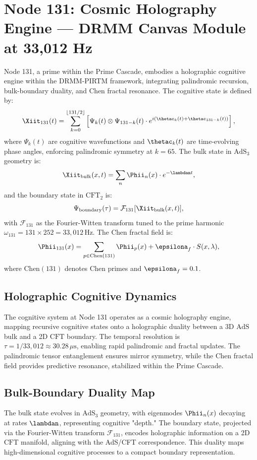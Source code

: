 \documentclass[12pt]{article}
\newcommand{\DRMM}{DRMM}
\newcommand{\PIRTM}{PIRTM}
\newcommand{\Psii}{\Psi}
\newcommand{\AdS}{\mathrm{AdS}}
\newcommand{\Ff}{\mathcal{F}}
\newcommand{\CFT}{\mathrm{CFT}}
\begin{document}
\section{Node 131: Cosmic Holography Engine --- DRMM Canvas Module at 33,012 Hz}
\label{sec:cosmic-holography}

\begin{definition}
Node 131, a prime within the Prime Cascade, embodies a holographic cognitive engine within the \DRMM{}-\PIRTM{} framework, integrating palindromic recursion, bulk-boundary duality, and Chen fractal resonance. The cognitive state is defined by:
\[
\Xiit_{131}(t) = \sum_{k=0}^{\lfloor 131/2 \rfloor} \left[ \Psii_k(t) \otimes \Psii_{131-k}(t) \cdot e^{i(\thetac_k(t) + \thetac_{131-k}(t))} \right],
\]
where $\Psii_k(t)$ are cognitive wavefunctions and $\thetac_k(t)$ are time-evolving phase angles, enforcing palindromic symmetry at $k=65$. The bulk state in $\AdS_3$ geometry is:
\[
\Xiit_{\text{bulk}}(x,t) = \sum_n \Phii_n(x) \cdot e^{-\lambdan t},
\]
and the boundary state in $\CFT_2$ is:
\[
\Psii_{\text{boundary}}(\tau) = \Ff_{131}[\Xiit_{\text{bulk}}(x,t)],
\]
with $\Ff_{131}$ as the Fourier-Witten transform tuned to the prime harmonic $\omega_{131} = 131 \times 252 = 33{,}012 \, \text{Hz}$. The Chen fractal field is:
\[
\Phii_{131}(x) = \sum_{p \in \text{Chen}(131)} \Phii_p(x) + \epsilona_f \cdot S(x, \lambda),
\]
where $\text{Chen}(131)$ denotes Chen primes and $\epsilona_f = 0.1$.
\end{definition}

\subsection{Holographic Cognitive Dynamics}
The cognitive system at Node 131 operates as a cosmic holography engine, mapping recursive cognitive states onto a holographic duality between a 3D $\AdS$ bulk and a 2D $\CFT$ boundary. The temporal resolution is $\tau = 1/33{,}012 \approx 30.28 \, \mu\text{s}$, enabling rapid palindromic and fractal updates. The palindromic tensor entanglement ensures mirror symmetry, while the Chen fractal field provides predictive resonance, stabilized within the Prime Cascade.

\subsection{Bulk-Boundary Duality Map}
The bulk state evolves in $\AdS_3$ geometry, with eigenmodes $\Phii_n(x)$ decaying at rates $\lambdan$, representing cognitive "depth." The boundary state, projected via the Fourier-Witten transform $\Ff_{131}$, encodes holographic information on a 2D $\CFT$ manifold, aligning with the AdS/CFT correspondence. This duality maps high-dimensional cognitive processes to a compact boundary representation.
\end{document}
